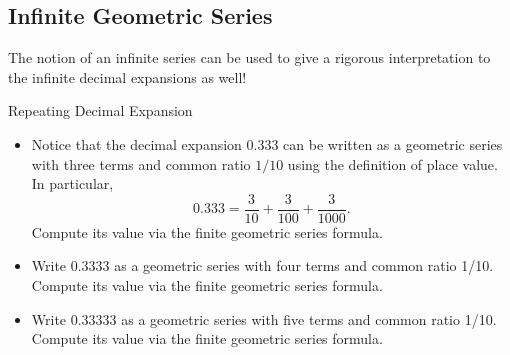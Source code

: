 \subsection{Infinite Geometric Series}\label{Geometrickery}
The notion of an infinite series can be used to give a rigorous interpretation to the infinite decimal expansions as well! 

\begin{exercise}{Repeating Decimal Expansion \Coffeecup \Coffeecup }\label{ThreeBar}

\begin{itemize}
\item Notice that the decimal expansion 0.333 can be written as a geometric series with three terms and common ratio $1/10$ using the definition of place value.  In particular, $$ 0.333=\frac{3}{10}+\frac{3}{100}+\frac{3}{1000}.$$ Compute its value via the finite geometric series formula.


\item Write 0.3333 as a geometric series with four terms and common ratio 1/10.  Compute its value via the finite geometric series formula.


\item Write 0.33333 as a geometric series with five terms and common ratio 1/10.  Compute its value via the finite geometric series formula.



\end{itemize}
\end{exercise}
